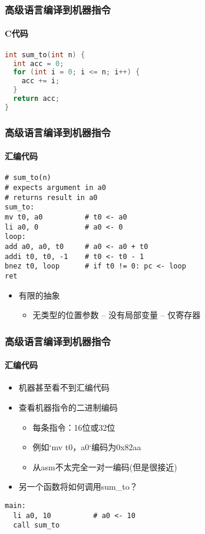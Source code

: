 \begin{frame}[fragile]
	\frametitle{高级语言编译到机器指令}
	\framesubtitle{C代码}
	
\begin{lstlisting}[language = C]
int sum_to(int n) {
  int acc = 0;
  for (int i = 0; i <= n; i++) {
    acc += i;
  }
  return acc;
}
\end{lstlisting}
	
\end{frame}



\begin{frame}[fragile]
\frametitle{高级语言编译到机器指令}
\framesubtitle{汇编代码}
	
\begin{lstlisting}
# sum_to(n)
# expects argument in a0
# returns result in a0
sum_to:
mv t0, a0          # t0 <- a0
li a0, 0           # a0 <- 0
loop:
add a0, a0, t0     # a0 <- a0 + t0
addi t0, t0, -1    # t0 <- t0 - 1
bnez t0, loop      # if t0 != 0: pc <- loop
ret
\end{lstlisting}	

\begin{itemize}
	
	\item 有限的抽象
	\begin{itemize}
	  \item 无类型的位置参数 -- 没有局部变量 -- 仅寄存器
	\end{itemize}
		
\end{itemize}
	
\end{frame}



\begin{frame}[fragile]
\frametitle{高级语言编译到机器指令}
\framesubtitle{汇编代码}
	
\begin{itemize}
	
	\item 机器甚至看不到汇编代码
	\item 查看机器指令的二进制编码
	\begin{itemize}
		\item 每条指令：16位或32位
		\item 例如`mv t0，a0`编码为0x82aa
		\item 从asm不太完全一对一编码(但是很接近)
	\end{itemize}
	
	\item 另一个函数将如何调用sum\_to？
\end{itemize}	

\begin{lstlisting}
main:
  li a0, 10          # a0 <- 10
  call sum_to
\end{lstlisting}

	
\end{frame}

